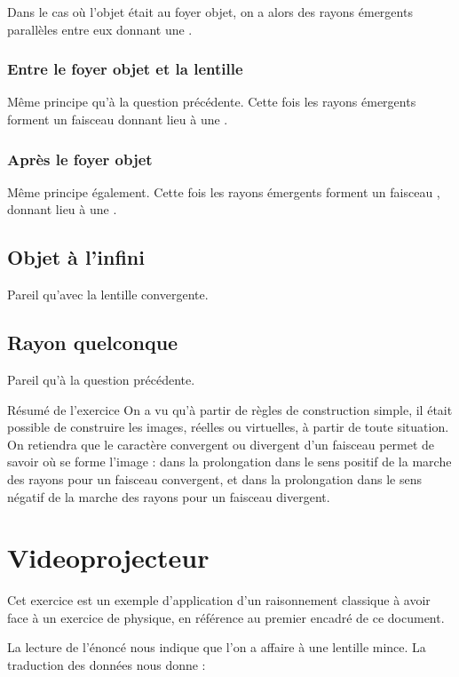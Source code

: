 \documentclass[10pt,a5paper,notitlepage]{book}
\begin{document}
Dans le cas où l'objet était au foyer objet, on a alors des rayons émergents
parallèles entre eux donnant une .

\subsubsection{Entre le foyer objet et la lentille}
Même principe qu'à la question précédente. Cette fois les rayons émergents
forment un faisceau  donnant lieu à une .

\subsubsection{Après le foyer objet}
Même principe également. Cette fois les rayons émergents forment un faisceau
, donnant lieu à une .

\subsection{Objet à l'infini}
Pareil qu'avec la lentille convergente.

\subsection{Rayon quelconque}
Pareil qu'à la question précédente.

\begin{impo}[label = resma]{Résumé de l'exercice}
    On a vu qu'à partir de règles de construction simple, il était possible de
    construire les images, réelles ou virtuelles, à partir de toute situation.
    On retiendra que le caractère convergent ou divergent d'un faisceau permet
    de savoir où se forme l'image : dans la prolongation dans le sens positif de
    la marche des rayons pour un faisceau convergent, et dans la prolongation
    dans le sens négatif de la marche des rayons pour un faisceau divergent.
\end{impo}

\section{Videoprojecteur}\label{ssec:vp}
Cet exercice est un exemple d'application d'un raisonnement classique à avoir
face à un exercice de physique, en référence au premier encadré de ce document.
\bigbreak

La lecture de l'énoncé nous indique que l'on a affaire à une lentille mince. La
traduction des données nous donne :
\end{document}
